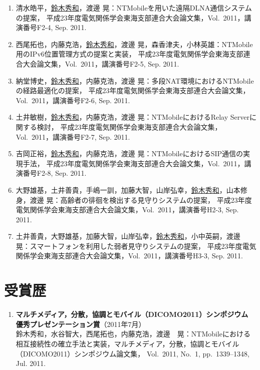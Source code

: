 \begin{enumerate}
\item 清水皓平，\underline{鈴木秀和}，渡邊 晃：NTMobileを用いた遠隔DLNA通信システムの提案，
平成23年度電気関係学会東海支部連合大会論文集，Vol.~2011，講演番号F2-4, Sep. 2011.

\item 西尾拓也，内藤克浩，\underline{鈴木秀和}，渡邊 晃，森香津夫，小林英雄：NTMobile用のIPv6位置管理方式の提案と実装，
平成23年度電気関係学会東海支部連合大会論文集，Vol.~2011，講演番号F2-5, Sep. 2011.

\item 納堂博史，\underline{鈴木秀和}，内藤克浩，渡邊 晃：多段NAT環境におけるNTMobileの経路最適化の提案，
平成23年度電気関係学会東海支部連合大会論文集，Vol.~2011，講演番号F2-6, Sep. 2011.

\item 土井敏樹，\underline{鈴木秀和}，内藤克浩，渡邊 晃：NTMobileにおけるRelay Serverに関する検討，
平成23年度電気関係学会東海支部連合大会論文集，Vol.~2011，講演番号F2-7, Sep. 2011.

\item 吉岡正裕，\underline{鈴木秀和}，内藤克浩，渡邊 晃：NTMobileにおけるSIP通信の実現手法，
平成23年度電気関係学会東海支部連合大会論文集，Vol.~2011，講演番号F2-8, Sep. 2011.

\item 大野雄基，土井善貴，手嶋一訓，加藤大智，山岸弘幸，\underline{鈴木秀和}，山本修身，渡邊 晃：高齢者の徘徊を検出する見守りシステムの提案，
平成23年度電気関係学会東海支部連合大会論文集，Vol.~2011，講演番号H2-3, Sep. 2011.

\item 土井善貴，大野雄基，加藤大智，山岸弘幸，\underline{鈴木秀和}，小中英嗣，渡邊 晃：スマートフォンを利用した弱者見守りシステムの提案，
平成23年度電気関係学会東海支部連合大会論文集，Vol.~2011，講演番号H3-3, Sep. 2011.
\end{enumerate}


\section*{受賞歴}
\begin{enumerate}
\item {\bf マルチメディア，分散，協調とモバイル（DICOMO2011）シンポジウム 優秀プレゼンテーション賞}（2011年7月）\\
鈴木秀和，水谷智大，西尾拓也，内藤克浩，渡邊　晃：NTMobileにおける相互接続性の確立手法と実装，マルチメディア，分散，協調とモバイル（DICOMO2011）シンポジウム論文集，
Vol.~2011, No.~1, pp.\ 1339--1348, Jul. 2011.
\end{enumerate}


